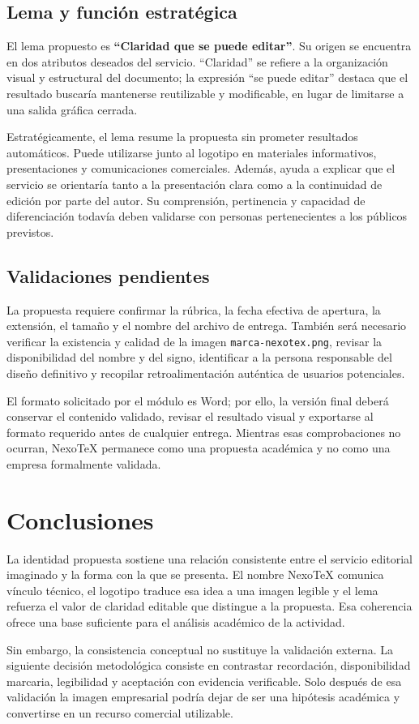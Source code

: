 {\subsection{Lema y función estratégica}

El lema propuesto es \textbf{``Claridad que se puede editar''}. Su origen se encuentra en dos atributos deseados del servicio. ``Claridad'' se refiere a la organización visual y estructural del documento; la expresión ``se puede editar'' destaca que el resultado buscaría mantenerse reutilizable y modificable, en lugar de limitarse a una salida gráfica cerrada.

Estratégicamente, el lema resume la propuesta sin prometer resultados automáticos. Puede utilizarse junto al logotipo en materiales informativos, presentaciones y comunicaciones comerciales. Además, ayuda a explicar que el servicio se orientaría tanto a la presentación clara como a la continuidad de edición por parte del autor. Su comprensión, pertinencia y capacidad de diferenciación todavía deben validarse con personas pertenecientes a los públicos previstos.

\subsection{Validaciones pendientes}

La propuesta requiere confirmar la rúbrica, la fecha efectiva de apertura, la extensión, el tamaño y el nombre del archivo de entrega. También será necesario verificar la existencia y calidad de la imagen \texttt{marca-nexotex.png}, revisar la disponibilidad del nombre y del signo, identificar a la persona responsable del diseño definitivo y recopilar retroalimentación auténtica de usuarios potenciales.

El formato solicitado por el módulo es Word; por ello, la versión final deberá conservar el contenido validado, revisar el resultado visual y exportarse al formato requerido antes de cualquier entrega. Mientras esas comprobaciones no ocurran, NexoTeX permanece como una propuesta académica y no como una empresa formalmente validada.

\section{Conclusiones}

La identidad propuesta sostiene una relación consistente entre el servicio editorial imaginado y la forma con la que se presenta. El nombre NexoTeX comunica vínculo técnico, el logotipo traduce esa idea a una imagen legible y el lema refuerza el valor de claridad editable que distingue a la propuesta. Esa coherencia ofrece una base suficiente para el análisis académico de la actividad.

Sin embargo, la consistencia conceptual no sustituye la validación externa. La siguiente decisión metodológica consiste en contrastar recordación, disponibilidad marcaria, legibilidad y aceptación con evidencia verificable. Solo después de esa validación la imagen empresarial podría dejar de ser una hipótesis académica y convertirse en un recurso comercial utilizable.
}

